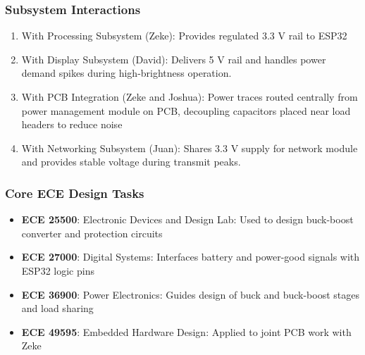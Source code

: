 \subsubsection{Subsystem Interactions}
\begin{enumerate}
    \item {With Processing Subsystem (Zeke): Provides regulated 3.3 V rail to ESP32}
    \item {With Display Subsystem (David): Delivers 5 V rail and handles power demand spikes during high-brightness operation.}
    \item {With PCB Integration (Zeke and Joshua): Power traces routed centrally from power management module on PCB, decoupling capacitors placed near load headers to reduce noise}
    \item {With Networking Subsystem (Juan): Shares 3.3 V supply for network module and provides stable voltage during transmit peaks.}
\end{enumerate}

\subsubsection{Core ECE Design Tasks}
\begin{itemize}
    \item \textbf{ECE 25500}: Electronic Devices and Design Lab: Used to design buck-boost converter and protection circuits
    \item \textbf{ECE 27000}: Digital Systems: Interfaces battery and power-good signals with ESP32 logic pins
    \item \textbf{ECE 36900}: Power Electronics: Guides design of buck and buck-boost stages and load sharing
    \item \textbf{ECE 49595}: Embedded Hardware Design: Applied to joint PCB work with Zeke
\end{itemize}

